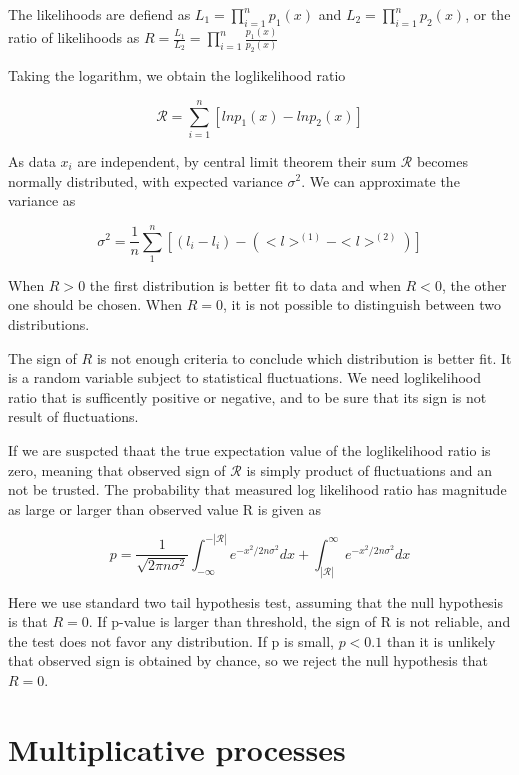 The likelihoods are defiend as $L_1=\prod_{i=1}^{n}p_1(x)$ and $L_2=\prod_{i=1}^{n}p_2(x)$, or the ratio of likelihoods as $R=\frac{L_1}{L_2} = \prod_{i=1}^{n} \frac{p_1(x)}{p_2(x)}$

Taking the logarithm, we obtain the loglikelihood ratio

\begin{equation}
\mathcal{R} = \sum_{i=1}^{n} \left[ln p_1(x) - ln p_2(x)\right]
\end{equation}

As data $x_i$ are independent, by central limit theorem their sum $\mathcal{R}$ becomes normally distributed, with expected variance $\sigma^2$. We can approximate the variance as 

$$\sigma^2 = \frac{1}{n}\sum_{1}^{n}[(l_i - l_i) - (<l>^{(1)}- <l>^{(2)})]$$

When $R>0$ the first distribution is better fit to data and when $R<0$, the other one should be chosen. When $R=0$, it is not possible to distinguish between two distributions. 

The sign of $R$ is not enough criteria to conclude which distribution is better fit. It is a random variable subject to statistical fluctuations. We need loglikelihood ratio that is sufficently positive or negative, and to be sure that its sign is not result of fluctuations.

If we are suspcted thaat the true expectation value of the loglikelihood ratio is zero, meaning that observed sign of $\mathcal{R}$ is simply product of fluctuations and an not be trusted. The probability that measured log likelihood ratio has magnitude as large or larger than observed value R is given as

\begin{equation}
p = \frac{1}{\sqrt{2\pi n \sigma^2}} \int_{-\infty}^{-|\mathcal{R}|}e^{-x^2/2n\sigma^2}dx + \int_{|\mathcal{R}|}^{\infty}e^{-x^2/2n\sigma^2}dx
\end{equation}

Here we use standard two tail hypothesis test, assuming that the null hypothesis is that $R= 0$. If p-value is larger than threshold, the sign of R is not reliable, and the test does not favor any distribution. If p is small, $p<0.1$ than it is unlikely that observed sign is obtained by chance, so we reject the null hypothesis that $R=0$. 

\section{Multiplicative processes}

